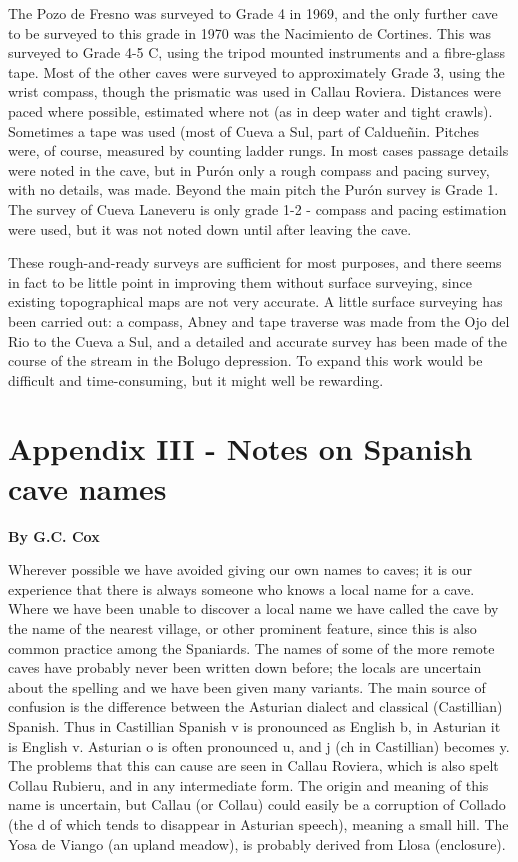\documentclass[11pt, a4paper, twoside]{memoir}
\begin{document}
The Pozo de Fresno was surveyed to Grade 4 in 1969, and the only further cave to be surveyed to this grade in 1970 was the Nacimiento de Cortines. This was surveyed to Grade 4-5 C, using the tripod mounted instruments and a fibre-glass tape. Most of the other caves were surveyed to approximately Grade 3, using the wrist compass, though the prismatic was used in Callau Roviera. Distances were paced where possible, estimated where not (as in deep water and tight crawls). Sometimes a tape was used (most of Cueva a Sul, part of Caldueñin. Pitches were, of course, measured by counting ladder rungs. In most cases passage details were noted in the cave, but in Purón only a rough compass and pacing survey, with no details, was made. Beyond the main pitch the Purón survey is Grade 1. The survey of Cueva Laneveru is only grade 1-2 - compass and pacing estimation were used, but it was not noted down until after leaving the cave.

These rough-and-ready surveys are sufficient for most purposes, and there seems in fact to be little point in improving them without surface surveying, since existing topographical maps are not very accurate. A little surface surveying has been carried out: a compass, Abney and tape traverse was made from the Ojo del Rio to the Cueva a Sul, and a detailed and accurate survey has been made of the course of the stream in the Bolugo depression. To expand this work would be difficult and time-consuming, but it might well be rewarding.


\chapter*{Appendix III - Notes on Spanish cave names}
\textbf{By G.C. Cox}

Wherever possible we have avoided giving our own names to caves; it is our experience that there is always someone who knows a local name for a cave. Where we have been unable to discover a local name we have called the cave by the name of the nearest village, or other prominent feature, since this is also common practice among the Spaniards. The names of some of the more remote caves have probably never been written down before; the locals are uncertain about the spelling and we have been given many variants. The main source of confusion is the difference between the Asturian dialect and classical (Castillian) Spanish. Thus in Castillian Spanish v is pronounced as English b, in Asturian it is English v. Asturian o is often pronounced u, and j (ch in Castillian) becomes y. The problems that this can cause are seen in Callau Roviera, which is also spelt Collau Rubieru, and in any intermediate form. The origin and meaning of this name is uncertain, but Callau (or Collau) could easily be a corruption of Collado (the d of which tends to disappear in Asturian speech), meaning a small hill. The Yosa de Viango (an upland meadow), is probably derived from Llosa (enclosure).
\end{document}
